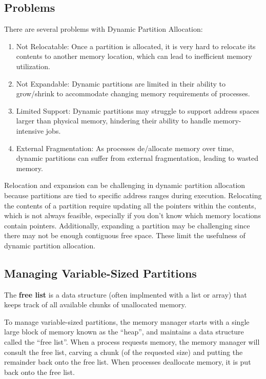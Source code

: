 \documentclass{report}
\newcommand{\definitionBegin}[1]{\begin{tcolorbox}[title={Definition: #1}]}
\newcommand{\definitionEnd}{\end{tcolorbox}}
\begin{document}
\subsection{Problems}
\label{subsec:PROB2}
There are several problems with Dynamic Partition Allocation:
\begin{enumerate}[label=\textit{(\roman*)}]
\item Not Relocatable: Once a partition is allocated, it is very hard to relocate its contents to
  another memory location, which can lead to inefficient memory utilization.
\item Not Expandable: Dynamic partitions are limited in their ability to grow/shrink to
  accommodate changing memory requirements of processes.
\item Limited Support: Dynamic partitions may struggle to support address spaces larger than
  physical memory, hindering their ability to handle memory-intensive jobs.
\item External Fragmentation: As processes de/allocate memory over time, dynamic partitions can
  suffer from external fragmentation, leading to wasted memory.
\end{enumerate}
Relocation and expansion can be challenging in dynamic partition allocation because partitions
are tied to specific address ranges during execution. Relocating the contents of a partition require
updating all the pointers within the contents, which is not always feasible, especially if you don't
know which memory locations contain pointers. Additionally, expanding a partition may be challenging
since there may not be enough contiguous free space. These limit the usefulness of dynamic partition
allocation. 





\subsection{Managing Variable-Sized Partitions}
\label{subsec:FL}
\definitionBegin{Free List}
The \textbf{free list} is a data structure (often implmented with a list or array) that keeps track
of all available chunks of unallocated memory.
\definitionEnd

To manage variable-sized partitions, the memory manager starts with a single large block of memory
known as the ``heap'', and maintains a data structure called the ``free list''. When a process
requests memory, the memory manager will consult the free list, carving a chunk (of the requested
size) and putting the remainder back onto the free list. When processes deallocate memory, it is put
back onto the free list.
\end{document}
